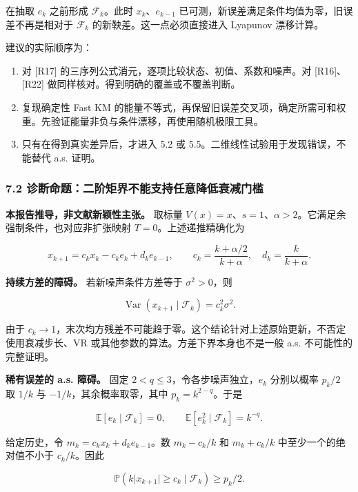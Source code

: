 \documentclass[
  chinese,
  10pt,
  a4paper,
]{article}
\providecommand{\tightlist}{%
  \setlength{\itemsep}{0pt}\setlength{\parskip}{0pt}}
\begin{document}
在抽取 \(e_k\) 之前形成 \(\mathcal F_k\)。此时 \(x_k\)、\(e_{k-1}\)
已可测，新误差满足条件均值为零，旧误差不再是相对于 \(\mathcal F_k\)
的新鞅差。这一点必须直接进入 Lyapunov 漂移计算。

建议的实际顺序为：

\begin{enumerate}
\def\labelenumi{\arabic{enumi}.}
\tightlist
\item
  对 {[}R17{]} 的三序列公式消元，逐项比较状态、初值、系数和噪声。对
  {[}R16{]}、{[}R22{]} 做同样核对。得到明确的覆盖或不覆盖判断。
\item
  复现确定性 Fast KM
  的能量不等式，再保留旧误差交叉项，确定所需可和权重。先验证能量非负与条件漂移，再使用随机极限工具。
\item
  只有在得到真实差异后，才进入 5.2 或
  5.5。二维线性试验用于发现错误，不能替代 a.s. 证明。
\end{enumerate}

\subsubsection{7.2
诊断命题：二阶矩界不能支持任意降低衰减门槛}\label{ux8bcaux65adux547dux9898ux4e8cux9636ux77e9ux754cux4e0dux80fdux652fux6301ux4efbux610fux964dux4f4eux8870ux51cfux95e8ux69db}

\textbf{本报告推导，非文献新颖性主张。} 取标量
\(V(x)=x\)、\(s=1\)、\(\alpha>2\)。它满足余强制条件，也对应非扩张映射
\(T=0\)。上述递推精确化为

\[
x_{k+1}=c_kx_k-c_ke_k+d_ke_{k-1},\qquad c_k=\frac{k+\alpha/2}{k+\alpha},\quad d_k=\frac{k}{k+\alpha}.
\]

\textbf{持续方差的障碍。} 若新噪声条件方差等于 \(\sigma^2>0\)，则

\[
\operatorname{Var}(x_{k+1}\mid\mathcal F_k)=c_k^2\sigma^2.
\]

由于
\(c_k\to1\)，末次均方残差不可能趋于零。这个结论针对上述原始更新，不否定使用衰减步长、VR
或其他参数的算法。方差下界本身也不是一般 a.s. 不可能性的完整证明。

\textbf{稀有误差的 a.s. 障碍。} 固定
\(2<q\le3\)，令各步噪声独立，\(e_k\) 分别以概率 \(p_k/2\) 取 \(1/k\) 与
\(-1/k\)，其余概率取零，其中 \(p_k=k^{2-q}\)。于是

\[
\mathbb E[e_k\mid\mathcal F_k]=0,\qquad \mathbb E[e_k^2\mid\mathcal F_k]=k^{-q}.
\]

给定历史，令 \(m_k=c_kx_k+d_ke_{k-1}\)。数 \(m_k-c_k/k\) 和
\(m_k+c_k/k\) 中至少一个的绝对值不小于 \(c_k/k\)。因此

\[
\mathbb P\!\left(k\lvert x_{k+1}\rvert\ge c_k\mid\mathcal F_k\right)\ge p_k/2.
\]
\end{document}
